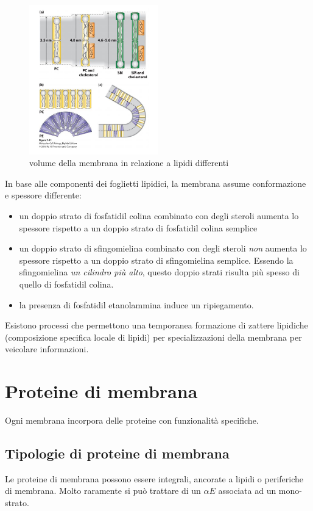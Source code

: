         \begin{figure}[h]
            \centering
            \includegraphics[width=0.5\textwidth]{images/doppiostrato.JPG}
            \caption{\small volume della membrana in relazione a lipidi differenti}
            \label{fig:mesh1}
        \end{figure}
        
        In base alle componenti dei foglietti lipidici, la membrana assume conformazione e spessore differente:
        \begin{itemize}
            \item un doppio strato di fosfatidil colina combinato con degli steroli aumenta lo spessore rispetto a un doppio strato di fosfatidil colina semplice
            \item un doppio strato di sfingomielina combinato con degli steroli \textit{non} aumenta lo spessore rispetto a un doppio strato di sfingomielina semplice. Essendo la sfingomielina \textit{un cilindro più alto}, questo doppio strati risulta più spesso di quello di fosfatidil colina.
            \item la presenza di fosfatidil etanolammina induce un ripiegamento.
        \end{itemize}
        
        Esistono processi che permettono una temporanea formazione di zattere lipidiche (composizione specifica locale di lipidi) per specializzazioni della membrana per veicolare informazioni.
    
\section{Proteine di membrana}
    \small
    Ogni membrana incorpora delle proteine con funzionalità specifiche.
    \subsection{Tipologie di proteine di membrana}
        Le proteine di membrana possono essere integrali, ancorate a lipidi o periferiche di membrana. Molto raramente si può trattare di un $\alpha E$ associata ad un mono-strato.
        
